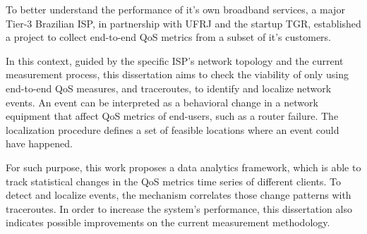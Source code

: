 To better understand the performance of it's own broadband services, a major
Tier-3 Brazilian ISP, in partnership with UFRJ and the startup TGR,
established a project to collect end-to-end QoS metrics from a subset
of it's customers.

In this context, guided by the specific ISP's network topology
and the current measurement process,
this dissertation aims to check the viability of
only using end-to-end QoS measures, and traceroutes,
to identify and localize network events. An event can be interpreted as a
behavioral change in a network equipment that affect QoS metrics of end-users,
such as a router failure. The localization procedure defines a set of
feasible locations where an event could have happened.

For such purpose, this work proposes a data analytics framework, which is able
to track statistical changes in the QoS metrics time series of different
clients.
To detect and localize events, the mechanism correlates those change
patterns with traceroutes.
In order to increase the system's performance,
this dissertation also indicates possible improvements on the current
measurement methodology.
